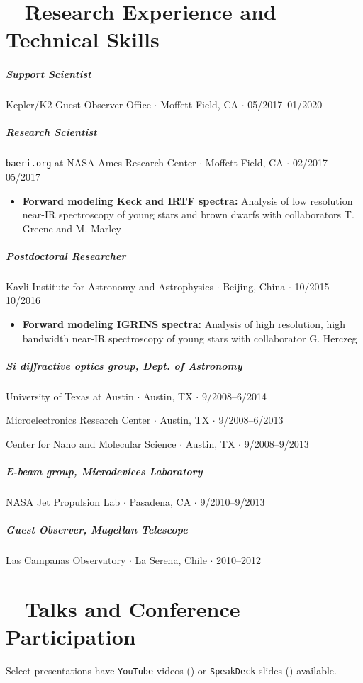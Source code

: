 \documentclass[10pt,letterpaper]{article}
\begin{document}
\section*{\faWrench ~ Research Experience and Technical Skills}

\subparagraph{Support Scientist}
Kepler/K2 Guest Observer Office $\cdot$ Moffett Field, CA $\cdot$ 05/2017--01/2020

\subparagraph{Research Scientist}
\texttt{baeri.org} at NASA Ames Research Center $\cdot$ Moffett Field, CA $\cdot$ 02/2017--05/2017
\begin{itemize}
    \item  \textbf{Forward modeling Keck and IRTF spectra:} Analysis of low resolution near-IR spectroscopy of young stars and brown dwarfs with collaborators T. Greene and M. Marley
\end{itemize}

\subparagraph{Postdoctoral Researcher}
Kavli Institute for Astronomy and Astrophysics $\cdot$ Beijing, China $\cdot$ 10/2015--10/2016
\begin{itemize}
    \item  \textbf{Forward modeling IGRINS spectra:} Analysis of high resolution, high bandwidth near-IR spectroscopy of young stars with collaborator G. Herczeg
\end{itemize}

\subparagraph{Si diffractive optics group, Dept. of Astronomy}
University of Texas at Austin $\cdot$ Austin, TX $\cdot$ 9/2008--6/2014
\begin{flushright}
Microelectronics Research Center $\cdot$ Austin, TX $\cdot$ 9/2008--6/2013

Center for Nano and Molecular Science $\cdot$ Austin, TX $\cdot$ 9/2008--9/2013
\end{flushright}


\subparagraph{E-beam group, Microdevices Laboratory}
NASA Jet Propulsion Lab $\cdot$ Pasadena, CA $\cdot$ 9/2010--9/2013

\subparagraph{Guest Observer, Magellan Telescope}
Las Campanas Observatory $\cdot$ La Serena, Chile $\cdot$ 2010--2012


\section*{\faSlideshare ~ Talks and Conference Participation}

Select presentations have \texttt{YouTube} videos (\faYoutube) or \texttt{SpeakDeck} slides (\faSpeakerDeck) available.
\end{document}
